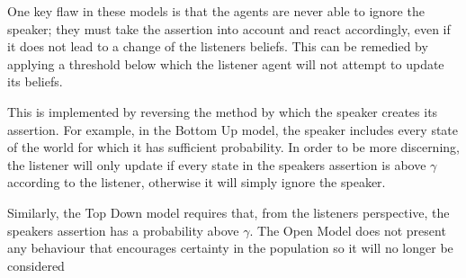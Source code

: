 One key flaw in these models is that the agents are never able to ignore the speaker; they must take the assertion into account and react accordingly, even if it does not lead to a change of the listeners beliefs. This can be remedied by applying a threshold below which the listener agent will not attempt to update its beliefs. 

This is implemented by reversing the method by which the speaker creates its assertion. For example, in the Bottom Up model, the speaker includes every state of the world for which it has sufficient probability. In order to be more discerning, the listener will only update if every state in the speakers assertion is above $\gamma$ according to the listener, otherwise it will simply ignore the speaker. 

Similarly, the Top Down model requires that, from the listeners perspective, the speakers assertion has a probability above $\gamma$. The Open Model does not present any behaviour that encourages certainty in the population so it will no longer be considered




